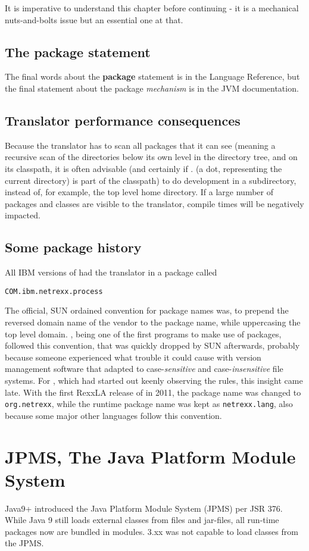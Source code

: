 {It is imperative to understand this chapter before continuing - it is
a mechanical nuts-and-bolts issue but an essential one at that.

\section{The package statement}
The final words about the \nr{} \textbf{package} statement is in the
\nr{} Language Reference, but the final statement about the package
\emph{mechanism} is in the JVM documentation.
\section{Translator performance consequences}
Because the \nr{} translator has to scan all packages that it can
see (meaning a recursive scan of the directories below its own level
in the directory tree, and on its classpath, it is often advisable
(and certainly if . (a dot, representing the current directory) is part of the classpath)
to do development in a subdirectory, instead of, for example, the top
level home directory. If a large number of packages and classes are
visible to the translator, compile times will be negatively impacted. 

\section{Some \nr{} package history}
All IBM versions of \nr{} had the translator in a package called
\begin{verbatim}
COM.ibm.netrexx.process 
\end{verbatim}
The official, SUN ordained
convention for package names was, to prepend the reversed domain name
of the vendor to the package name, while uppercasing the top level
domain. \nr{}, being one of the first programs to make use of
packages, followed this convention, that was quickly dropped by SUN
afterwards, probably because someone experienced what trouble it could
cause with version management software that adapted to
case-\emph{sensitive} and case-\emph{insensitive} file systems. For
\nr{}, which had started out keenly observing the rules, this
insight came late. With the first RexxLA release of \nr{} in 2011, the package
name was changed to \texttt{org.netrexx}, while the runtime package
name was kept as \texttt{netrexx.lang}, also because some major other
languages follow this convention.

\chapter{JPMS, The Java Platform Module System}
Java9+ introduced the Java Platform Module System (JPMS) per JSR 376.
While Java 9 still loads external classes from files and jar-files, all
run-time packages now are bundled in modules.
\nr{} 3.xx was not capable to load classes from the JPMS.

}
